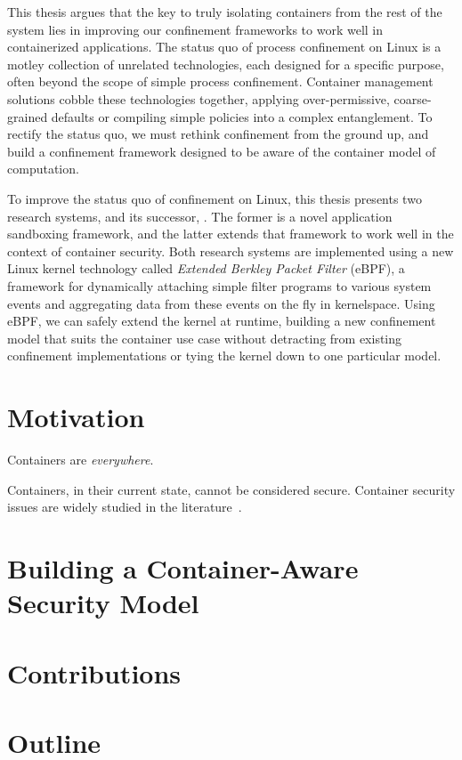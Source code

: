 \begin{inprogress}
This thesis argues that the key to truly isolating containers from the rest of the system
lies in improving our confinement frameworks to work well in containerized applications.
The status quo of process confinement on Linux is a motley collection of unrelated
technologies, each designed for a specific purpose, often beyond the scope of simple
process confinement. Container management solutions cobble these technologies together,
applying over-permissive, coarse-grained defaults or compiling simple policies into
a complex entanglement. To rectify the status quo, we must rethink confinement from the
ground up, and build a confinement framework designed to be aware of the container model
of computation.

To improve the status quo of confinement on Linux, this thesis presents two research
systems, \bpfbox{} and its successor, \bpfcontain{}. The former is a novel application
sandboxing framework, and the latter extends that framework to work well in the context of
container security. Both research systems are implemented using a new Linux kernel
technology called \textit{Extended Berkley Packet Filter} (eBPF), a framework for
dynamically attaching simple filter programs to various system events and aggregating data
from these events on the fly in kernelspace. Using eBPF, we can safely extend the kernel
at runtime, building a new confinement model that suits the container use case without
detracting from existing confinement implementations or tying the kernel down to one
particular model.
\end{inprogress}


\section{Motivation}%
\label{s:motivation}

\begin{inprogress}
Containers are \textit{everywhere}.


Containers, in their current state, cannot be considered secure.
Container security issues are widely studied in the literature~.
\end{inprogress}


\section{Building a Container-Aware Security Model}%
\label{s:container-aware}


\section{Contributions}%
\label{s:contributions}


\section{Outline}%
\label{s:outline}
